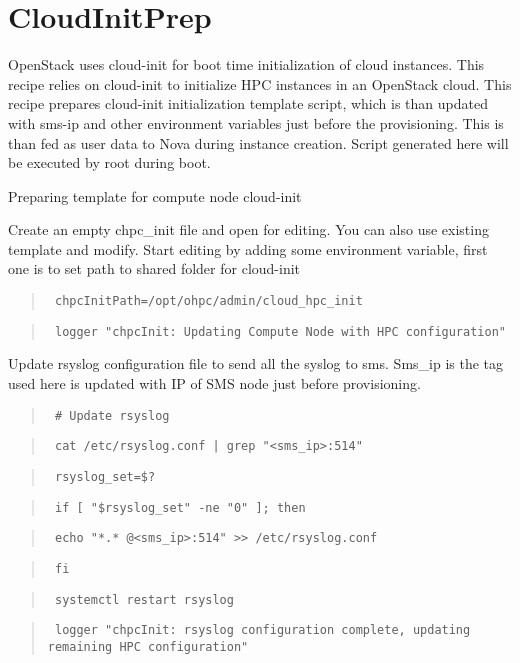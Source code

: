 
\begin{section}
	\newenvironment{bash}
	{\begin{quote}
		}
		{
		\end{quote}
	}
\section[]{CloudInitPrep}

OpenStack uses cloud-init for boot time initialization of cloud instances. This recipe relies on cloud-init to initialize HPC instances in an OpenStack cloud. This recipe prepares cloud-init initialization template script, which is than updated with sms-ip and other environment variables just before the provisioning. This is than fed as user data to Nova during instance creation. Script generated here will be executed by root during boot.

Preparing template for compute node cloud-init

Create an empty chpc\_init file and open for editing. You can also use existing template and modify.
Start editing by adding some environment variable, first one is to set path to shared folder for cloud-init

\begin{bash}\texttt{\small{ chpcInitPath=/opt/ohpc/admin/cloud\_hpc\_init}}\end{bash}
\begin{bash}\texttt{\small{ logger "chpcInit: Updating Compute Node with HPC configuration"}}\end{bash}

Update rsyslog configuration file to send all the syslog to sms. Sms\_ip is the tag used here is updated with IP of SMS node just before provisioning.

\begin{bash}\texttt{\small{ \# Update rsyslog}}\end{bash}
\begin{bash}\texttt{\small{ cat /etc/rsyslog.conf | grep "<sms\_ip>:514"}}\end{bash}
\begin{bash}\texttt{\small{ rsyslog\_set=\$?}}\end{bash}
\begin{bash}\texttt{\small{ if [ "\${rsyslog\_set}" -ne "0" ]; then}}\end{bash}
\begin{bash}\texttt{\small{     echo "*.* @<sms\_ip>:514" >> /etc/rsyslog.conf}}\end{bash}
\begin{bash}\texttt{\small{ fi}}\end{bash}
\begin{bash}\texttt{\small{ systemctl restart rsyslog}}\end{bash}
\begin{bash}\texttt{\small{ logger "chpcInit: rsyslog configuration complete, updating remaining HPC configuration"}}\end{bash}


\end{section}
